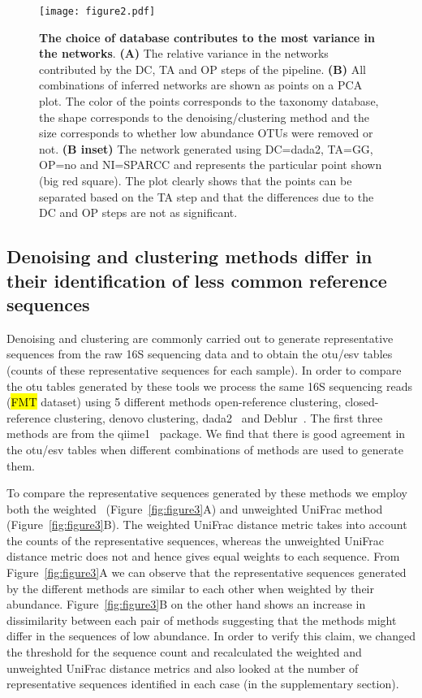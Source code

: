   \begin{figure}
    \centering
    \texttt{[image: figure2.pdf]}
    \caption{
      \textbf{The choice of database contributes to the most variance in the networks}.
      \textbf{(A)} The relative variance in the networks contributed by the DC, TA and OP steps of the pipeline.
      \textbf{(B)} All combinations of inferred networks are shown as points on a PCA plot.
      The color of the points corresponds to the taxonomy database, the shape corresponds to the denoising/clustering method and the size corresponds to whether low abundance OTUs were removed or not.
      \textbf{(B inset)} The network generated using DC=dada2, TA=GG, OP=no and NI=SPARCC and represents the particular point shown (big red square).
      The plot clearly shows that the points can be separated based on the TA step and that the differences due to the DC and OP steps are not as significant.
    }
    \label{fig:figure2}
  \end{figure}

  \FloatBarrier

  \subsection*{Denoising and clustering methods differ in their identification of less common reference sequences}

  Denoising and clustering are commonly carried out to generate representative sequences from the raw 16S sequencing data and to obtain the \ac{otu}/\ac{esv} tables (counts of these representative sequences for each sample).
  In order to compare the \ac{otu} tables generated by these tools we process the same 16S sequencing reads (\hl{FMT} dataset) using 5 different methods \- open-reference clustering, closed-reference clustering, denovo clustering, \ac{dada2}~\cite{Callahan2016} and Deblur~\cite{Amir2017}.
  The first three methods are from the \ac{qiime1}~\cite{Caporaso2010} package.
  We find that there is good agreement in the \ac{otu}/\ac{esv} tables when different combinations of methods are used to generate them.

  To compare the representative sequences generated by these methods we employ both the weighted~\cite{Lozupone2007} (Figure~\ref{fig:figure3}A) and unweighted UniFrac method~\cite{Lozupone2005} (Figure~\ref{fig:figure3}B).
  The weighted UniFrac distance metric takes into account the counts of the representative sequences, whereas the unweighted UniFrac distance metric does not and hence gives equal weights to each sequence.
  From Figure~\ref{fig:figure3}A we can observe that the representative sequences generated by the different methods are similar to each other when weighted by their abundance.
  Figure~\ref{fig:figure3}B on the other hand shows an increase in dissimilarity between each pair of methods suggesting that the methods might differ in the sequences of low abundance.
  In order to verify this claim, we changed the threshold for the sequence count and recalculated the weighted and unweighted UniFrac distance metrics and also looked at the number of representative sequences identified in each case (in the supplementary section).

